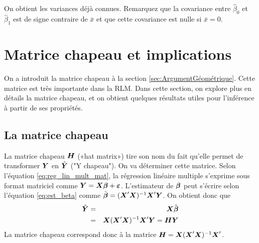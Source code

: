 On obtient les variances déjà connues. Remarquez que la covariance entre $\hat{\beta}_0$ et $\hat{\beta}_1$ est de signe contraire de $\bar{x}$ et que cette covariance est nulle si $\bar{x}=0$. %
%
%



\section{Matrice chapeau et implications}
\label{sec:MatriceChapeau}

On a introduit la matrice chapeau à la section \ref{sec:ArgumentGéométrique}. Cette matrice est très importante dans la RLM. Dans cette section, on explore plus en détails la matrice chapeau, et on obtient quelques résultats utiles pour l'inférence à partir de ses propriétés.

\subsection{La matrice chapeau}
\label{sec:LaMatriceChapeau}

La matrice chapeau $\boH$ («hat matrix») tire son nom du fait qu'elle permet de transformer $\boY$ en $\hY$ ("Y chapeau"). On va déterminer cette matrice. Selon l'équation \eqref{eq:reg_lin_mult_mat}, la régression linéaire multiple s'exprime sous format matriciel comme $\boY = \boX\bobeta + \boeps$.
L'estimateur de $\bobeta$ peut s'écrire selon l'équation \eqref{eq:est_beta} comme $\hbobeta = (\boX'\boX)^{-1}\boX'\boY$. On obtient donc que
\begin{eqnarray*}
	\hY& =& \boX\hbobeta \\
    &= & \boX(\boX'\boX)^{-1}\boX'\boY=\boH\boY
\end{eqnarray*}
La matrice chapeau correspond donc à la matrice $\boH=\boX(\boX'\boX)^{-1}\boX'$.


